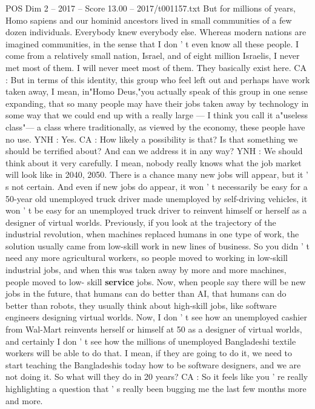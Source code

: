 \begin{textsample}{POS Dim 2 – 2017 – Score 13.00 – 2017/t001157.txt}
But for millions of years, Homo sapiens and our hominid ancestors lived in small communities of a few dozen individuals.
Everybody knew everybody else.
Whereas modern nations are imagined communities, in the sense that I don ' t even know all these people.
I come from a relatively small nation, Israel, and of eight million Israelis, I never met most of them.
I will never meet most of them.
They basically exist here.
CA : But in terms of this identity, this group who feel left out and perhaps have work taken away, I mean, in"Homo Deus,"you actually speak of this group in one sense expanding, that so many people may have their jobs taken away by technology in some way that we could end up with a really large — I think you call it a"useless class"— a class where traditionally, as viewed by the economy, these people have no use.
YNH : Yes.
CA : How likely a possibility is that?
Is that something we should be terrified about?
And can we address it in any way?
YNH : We should think about it very carefully.
I mean, nobody really knows what the job market will look like in 2040, 2050.
There is a chance many new jobs will appear, but it ' s not certain.
And even if new jobs do appear, it won ' t necessarily be easy for a 50-year old unemployed truck driver made unemployed by self-driving vehicles, it won ' t be easy for an unemployed truck driver to reinvent himself or herself as a designer of virtual worlds.
Previously, if you look at the trajectory of the industrial revolution, when machines replaced humans in one type of work, the solution usually came from low-skill work in new lines of business.
So you didn ' t need any more agricultural workers, so people moved to working in low-skill industrial jobs, and when this was taken away by more and more machines, people moved to low- skill \textbf{service} jobs.
Now, when people say there will be new jobs in the future, that humans can do better than AI, that humans can do better than robots, they usually think about high-skill jobs, like software engineers designing virtual worlds.
Now, I don ' t see how an unemployed cashier from Wal-Mart reinvents herself or himself at 50 as a designer of virtual worlds, and certainly I don ' t see how the millions of unemployed Bangladeshi textile workers will be able to do that.
I mean, if they are going to do it, we need to start teaching the Bangladeshis today how to be software designers, and we are not doing it.
So what will they do in 20 years?
CA : So it feels like you ' re really highlighting a question that ' s really been bugging me the last few months more and more.

\end{textsample}
